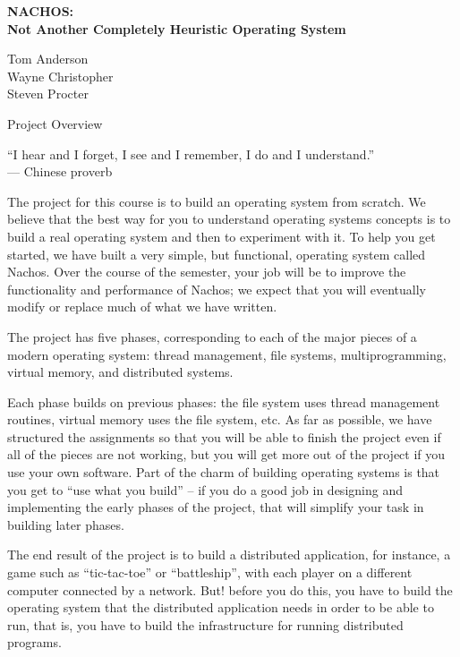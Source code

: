 


\begin{center}
{\large {\bf NACHOS: \\
\vspace{.1in}
Not Another Completely Heuristic Operating System}}

\vspace{.2in}
Tom Anderson\\
Wayne Christopher\\
Steven Procter


\vspace{.2in}
Project Overview
\vspace{.2in}

``I hear and I forget, I see and I remember, I do and I understand.''\\
--- Chinese proverb
\end{center}

The project for this course is to build an operating system from scratch.
We believe that the best way for you to understand operating systems
concepts is to build a real operating system and then to experiment with it.
To help you get started, we have built a very simple, but functional, 
operating system called Nachos.
Over the course of the semester, your job will be to improve the 
functionality and performance of Nachos; we expect that you will 
eventually modify or replace much of what we have written.

The project has five phases, corresponding to each of the major pieces 
of a modern operating system: thread management, file systems, 
multiprogramming, virtual memory, and distributed systems.

Each phase builds on previous phases: the file system uses thread 
management routines, virtual memory uses the file system, etc.
As far as possible, we have structured the assignments so that you 
will be able to finish the project even if all of the pieces are not working,
but you will get more out of the project if you use your own software.
Part of the charm of building operating systems is that you get to 
``use what you build'' -- if you do a good job in designing and 
implementing the early phases of the project, that will simplify your 
task in building later phases.

The end result of the project is to build a distributed application,
for instance, a game such as
``tic-tac-toe'' or ``battleship'', with each player on a different
computer connected by a network.  But! before you do this, you
have to build the operating system that the distributed application needs
in order to be able to run, that is, you have to build the infrastructure 
for running distributed programs.

